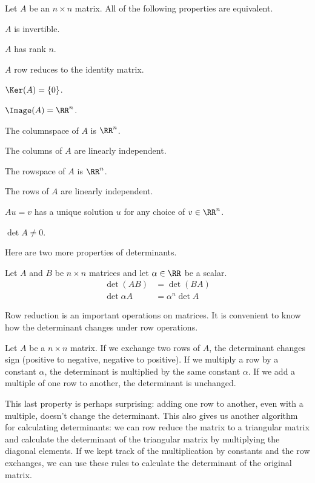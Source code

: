 \documentclass[fleqn]{report}
\begin{document}
\begin{prop}
Let $A$ be an $n \times n$ matrix. All of the following
properties are equivalent.
\begin{smallitemize}
\item $A$ is invertible.
\item $A$ has rank $n$.
\item $A$ row reduces to the identity matrix.
\item $\Ker(A) = \{0\}$.
\item $\Image(A) = \RR^n$.
\item The columnspace of $A$ is $\RR^n$. 
\item The columns of $A$ are linearly independent.
\item The rowspace of $A$ is $\RR^n$.
\item The rows of $A$ are linearly independent.
\item $Au = v$ has a unique solution $u$ for any choice of $v
\in \RR^n$.
\item $\det A \neq 0$.
\end{smallitemize}
\end{prop}

Here are two more properties of determinants.

\begin{prop}
Let $A$ and $B$ be $n \times n$ matrices and let $\alpha \in
\RR$ be a scalar.
\begin{align*}
\det (AB) & = \det (BA) \\
\det \alpha A & = \alpha^n \det A
\end{align*}
\end{prop}

Row reduction is an important operations on matrices. It is
convenient to know how the determinant changes under row
operations.

\begin{prop}
Let $A$ be a $n \times n$ matrix. If we exchange two rows of
$A$, the determinant changes sign (positive to negative,
negative to positive). If we multiply a row by a constant
$\alpha$, the determinant is multiplied by the same constant
$\alpha$. If we add a multiple of one row to another, the
determinant is unchanged.
\end{prop}

This last property is perhaps surprising: adding one row to
another, even with a multiple, doesn't change the determinant.
This also gives us another algorithm for calculating
determinants: we can row reduce the matrix to a triangular
matrix and calculate the determinant of the triangular matrix
by multiplying the diagonal elements. If we kept track of the
multiplication by constants and the row exchanges, we can use
these rules to calculate the determinant of the original
matrix.
\end{document}

